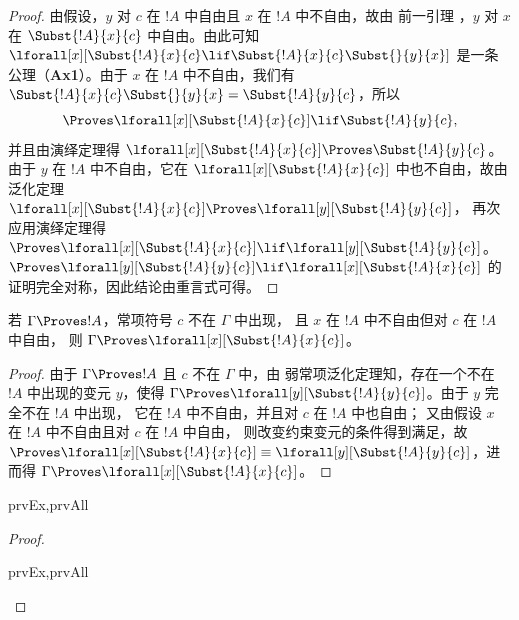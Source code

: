 \documentclass[../../../include/open-logic-section]{subfiles}
\begin{document}
\begin{proof}
由假设，$y$ 对 $c$ 在 $!A$ 中自由且 $x$ 在 $!A$ 中不自由，故由
前一引理 ，$y$ 对 $x$ 在 $\Subst{!A}{x}{c}$ 中自由。由此可知
$\lforall[x][\Subst{!A}{x}{c} \lif \Subst{!A}{x}{c} \Subst{}{y}{x}]$
是一条公理（\textbf{Ax1}）。由于 $x$ 在 $!A$ 中不自由，我们有
$\Subst{!A}{x}{c} \Subst{}{y}{x} = \Subst{!A}{y}{c}$，所以
\[
\Proves \lforall[x][\Subst{!A}{x}{c}] \lif \Subst{!A}{y}{c},
\]
并且由演绎定理得 $\lforall[x][\Subst{!A}{x}{c}] \Proves
\Subst{!A}{y}{c}$。由于 $y$ 在 $!A$ 中不自由，它在
$\lforall[x][\Subst{!A}{x}{c}]$ 中也不自由，故由泛化定理
$\lforall[x][\Subst{!A}{x}{c}] \Proves \lforall[y][\Subst{!A}{y}{c}]$，
再次应用演绎定理得 $\Proves
\lforall[x][\Subst{!A}{x}{c}] \lif \lforall[y][\Subst{!A}{y}{c}]$。
$\Proves \lforall[y][\Subst{!A}{y}{c}] \lif \lforall[x]
[\Subst{!A}{x}{c}]$ 的证明完全对称，因此结论由重言式可得。
\end{proof}

\begin{thm}[强常项泛化定理]
若 $\Gamma \Proves !A$，常项符号 $c$ 不在 $\Gamma$ 中出现，
且 $x$ 在 $!A$ 中不自由但对 $c$ 在 $!A$ 中自由，
则 $\Gamma \Proves \lforall[x][\Subst{!A}{x}{c}]$。
\end{thm}

\begin{proof}
由于 $\Gamma \Proves !A$ 且 $c$ 不在 $\Gamma$ 中，由
弱常项泛化定理知，存在一个不在 $!A$ 中出现的变元 $y$，使得
$\Gamma \Proves \lforall[y][\Subst{!A}{y}{c}]$。由于 $y$ 完全不在 $!A$ 中出现，
它在 $!A$ 中不自由，并且对 $c$ 在 $!A$ 中也自由；
又由假设 $x$ 在 $!A$ 中不自由且对 $c$ 在 $!A$ 中自由，
则改变约束变元的条件得到满足，故
$\Proves \lforall[x][\Subst{!A}{x}{c}] \equiv
\lforall[y][\Subst{!A}{y}{c}]$，进而得 $\Gamma \Proves
\lforall[x][\Subst{!A}{x}{c}]$。
\end{proof}

\begin{thm}
\begin{tagenumerate}{prvEx,prvAll}
\end{tagenumerate}
\end{thm}

\begin{proof}
\begin{tagenumerate}{prvEx,prvAll}

\end{tagenumerate}
\end{proof}
\end{document}
